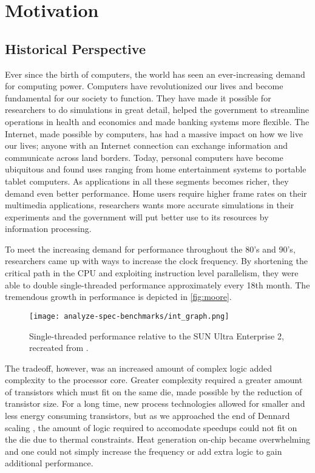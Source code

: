 \section{Motivation}

\subsection{Historical Perspective}

Ever since the birth of computers, the world has seen an ever-increasing demand
for computing power. Computers have revolutionized our lives and become
fundamental for our society to function. They have made it possible for
researchers to do simulations in great detail, helped the government to
streamline operations in health and economics and made banking systems more
flexible. The Internet, made possible by computers, has had a massive impact on
how we live our lives; anyone with an Internet connection can exchange
information and communicate across land borders. Today, personal computers have
become ubiquitous and found uses ranging from home entertainment systems to
portable tablet computers. As applications in all these segments becomes richer,
they demand even better performance. Home users require higher frame rates on
their multimedia applications, researchers wants more accurate simulations in
their experiments and the government will put better use to its resources by
information processing.

To meet the increasing demand for performance throughout the 80's and 90's,
researchers came up with ways to increase the clock frequency. By shortening the
critical path in the CPU and exploiting instruction level parallelism, they were
able to double single-threaded performance approximately every 18th month. The
tremendous growth in performance is depicted in \autoref{fig:moore}.

\begin{figure}
\texttt{[image: analyze-spec-benchmarks/int\_graph.png]}
\caption{Single-threaded performance relative to the SUN Ultra Enterprise 2,
recreated from \cite{preshing}.}
\label{fig:moore}
\end{figure}

The tradeoff, however, was an increased amount of complex logic added complexity
to the processor core. Greater complexity required a greater amount of
transistors which must fit on the same die, made possible by the reduction of
transistor size. For a long time, new process technologies allowed for smaller
and less energy consuming transistors, but as we approached the end of Dennard
scaling \cite{dennard}, the amount of logic required to accomodate speedups
could not fit on the die due to thermal constraints. Heat generation on-chip
became overwhelming and one could not simply increase the frequency or add
extra logic to gain additional performance.


